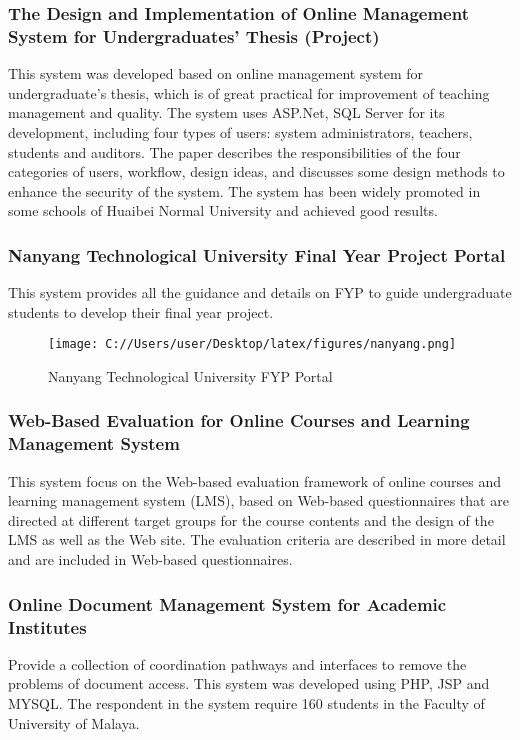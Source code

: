 \documentclass{article}
\begin{document}
\subsubsection{The Design and Implementation of Online Management System for Undergraduates’ Thesis (Project)}
\par This system was  developed based on online management system for undergraduate's thesis, which is of great practical for improvement of teaching management and quality. The system uses ASP.Net, SQL Server for its development, including four types of users: system administrators, teachers, students and auditors. The paper describes the responsibilities of the four
categories of users, workflow, design ideas, and discusses some design methods to enhance the security of the system. The system has been widely promoted in some schools of Huaibei Normal University and achieved good results.\cite{wangdesign}
\subsubsection{Nanyang Technological University Final Year Project Portal}
This system provides all the guidance and details on FYP to guide undergraduate students to develop their final year project.\cite{khazaliprogress}
 \begin{figure}[h!]
  \texttt{[image: C://Users/user/Desktop/latex/figures/nanyang.png]}
  \caption{Nanyang Technological University FYP Portal}
  \label{fig:nanyang}
\end{figure}
\subsubsection{Web-Based Evaluation for Online Courses and Learning Management System}
\par This system focus on the Web-based evaluation framework of online courses and learning management system (LMS), based on Web-based questionnaires that are directed at different target groups for the course contents and the design of the LMS as well as the Web site. The evaluation criteria are described in more detail and are included in Web-based questionnaires.\cite{snae2008web}
\subsubsection{Online Document Management System for Academic Institutes}
\par Provide a collection of coordination pathways and interfaces to remove the problems of document access. This system was developed using PHP, JSP and MYSQL. The respondent in the system require 160 students in the Faculty of University of Malaya.\cite{baban2010online}
\end{document}
